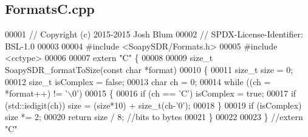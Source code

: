 \subsection{Formats\+C.\+cpp}
\label{FormatsC_8cpp_source}

\begin{DoxyCode}
00001 \textcolor{comment}{// Copyright (c) 2015-2015 Josh Blum}
00002 \textcolor{comment}{// SPDX-License-Identifier: BSL-1.0}
00003 
00004 \textcolor{preprocessor}{#include <SoapySDR/Formats.h>}
00005 \textcolor{preprocessor}{#include <cctype>}
00006 
00007 \textcolor{keyword}{extern} \textcolor{stringliteral}{"C"} \{
00008 
00009 \textcolor{keywordtype}{size\_t} SoapySDR_formatToSize(\textcolor{keyword}{const} \textcolor{keywordtype}{char} *format)
00010 \{
00011     \textcolor{keywordtype}{size\_t} size = 0;
00012     \textcolor{keywordtype}{size\_t} isComplex = \textcolor{keyword}{false};
00013     \textcolor{keywordtype}{char} ch = 0;
00014     \textcolor{keywordflow}{while} ((ch = *format++) != \textcolor{charliteral}{'\(\backslash\)0'})
00015     \{
00016         \textcolor{keywordflow}{if} (ch == \textcolor{charliteral}{'C'}) isComplex = \textcolor{keyword}{true};
00017         \textcolor{keywordflow}{if} (std::isdigit(ch)) size = (size*10) + \textcolor{keywordtype}{size\_t}(ch-\textcolor{charliteral}{'0'});
00018     \}
00019     \textcolor{keywordflow}{if} (isComplex) size *= 2;
00020     \textcolor{keywordflow}{return} size / 8; \textcolor{comment}{//bits to bytes}
00021 \}
00022 
00023 \} \textcolor{comment}{//extern "C"}
\end{DoxyCode}
